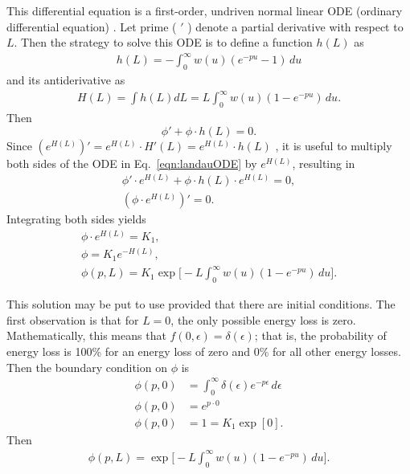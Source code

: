 This differential equation is a first-order, undriven normal linear ODE (ordinary differential equation) \cite{Borrelli}. Let prime ( $'$ ) denote a partial derivative with respect to $L$. Then the strategy to solve this ODE is to define a function $h(L)$ as
%
\begin{gather*}
h(L)=-\int_0 ^\infty w(u)  (e^{-pu}-1)\, du
\end{gather*}
and its antiderivative as
\begin{gather*}
H(L)=\int h(L) dL=L \int_0 ^\infty w(u)  (1-e^{-pu})\, du.
\end{gather*}
Then
\begin{equation}\label{eqn:landauODE}
\phi ' + \phi \cdot h(L) = 0.
\end{equation}
%
Since $(e^{H(L)}) ' = e^{H(L)}\cdot H'(L)= e^{H(L)}\cdot h(L)$ , it is useful to multiply both sides of the ODE in Eq.~\eqref{eqn:landauODE} by $e^{H(L)}$, resulting in
\begin{gather*}
\phi ' \cdot e^{H(L)}+ \phi \cdot h(L) \cdot e^{H(L)} = 0,\\
(\phi\cdot e^{H(L)}) ' = 0.
\end{gather*}
Integrating both sides yields
\begin{gather*}
\phi\cdot e^{H(L)}=K_1,\\
\phi = K_1 e^{-H(L)},\\
\phi(p,L)=K_1 \exp\Big[-L\int_0 ^\infty w(u)  (1-e^{-pu})\, du\Big].
\end{gather*}

This solution may be put to use provided that there are initial conditions. The first observation is that for $L=0$, the only possible energy loss is zero. Mathematically, this means that $f(0,\epsilon)=\delta(\epsilon)$; that is, the probability of energy loss is 100\% for an energy loss of zero and 0\% for all other energy losses. Then the boundary condition on $\phi$ is
\begin{align}
\phi(p,0)&=\int_0 ^\infty \delta(\epsilon) e^{-p\epsilon}\, d\epsilon\nonumber\\
\phi(p,0)&=e^{p\cdot 0}\nonumber\\
\phi(p,0)&=1=K_1\exp[0].\nonumber%
\end{align}
Then
\begin{gather*}
\phi(p,L)=\exp\Big[-L\int_0 ^\infty w(u)  (1-e^{-pu})\, du\Big].
\end{gather*}

